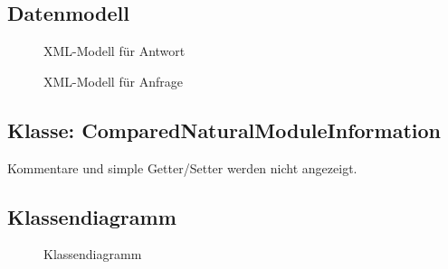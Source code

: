 
\clearpage

\subsection{Datenmodell}
\label{app:Datenmodell}
\begin{figure}[h]
    \centering
    \caption{XML-Modell für Antwort}        
\end{figure}
\begin{figure}[!htb]
    \centering
    \caption{XML-Modell für Anfrage}
\end{figure}
\clearpage


\clearpage


\clearpage


\subsection{Klasse: ComparedNaturalModuleInformation}
\label{app:CNMI}
Kommentare und simple Getter/Setter werden nicht angezeigt.

\clearpage

\subsection{Klassendiagramm}
\label{app:Klassendiagramm}
\begin{figure}[htb]
\centering
{}
\caption{Klassendiagramm}
\end{figure}
\clearpage


